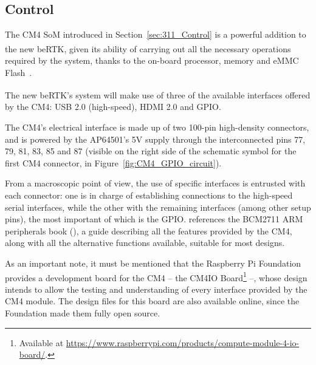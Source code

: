 






\subsection{Control}\label{sec:322_CONTROL}
The CM4 \gls{SoM} introduced in Section~\ref{sec:311_Control} is a powerful addition to the new beRTK\textsuperscript{\textregistered}, given its ability of carrying out all the necessary operations required by the system, thanks to the on-board processor, memory and eMMC Flash~\cite{CM4}.

The new beRTK\textsuperscript{\textregistered}'s system will make use of three of the available interfaces offered by the CM4: USB 2.0 (high-speed), HDMI 2.0 and GPIO.

The CM4's electrical interface is made up of two 100-pin high-density connectors, and is powered by the AP64501's 5V supply through the interconnected pins 77, 79, 81, 83, 85 and 87 (visible on the right side of the schematic symbol for the first CM4 connector, in Figure~\ref{fig:CM4_GPIO_circuit}).

From a macroscopic point of view, the use of specific interfaces is entrusted with each connector: one is in charge of establishing connections to the high-speed serial interfaces, while the other with the remaining interfaces (among other setup pins), the most important of which is the GPIO.
\cite{CM4} references the BCM2711 ARM peripherals book (\cite{BCM2711_book}), a guide describing all the features provided by the CM4, along with all the alternative functions available, suitable for most designs.

As an important note, it must be mentioned that the Raspberry Pi Foundation provides a development board for the CM4 -- the CM4IO Board\footnote[14]{Available at \url{https://www.raspberrypi.com/products/compute-module-4-io-board/}.} --, whose design intends to allow the testing and understanding of every interface provided by the CM4 module. The design files for this board are also available online, since the Foundation made them fully open source.

